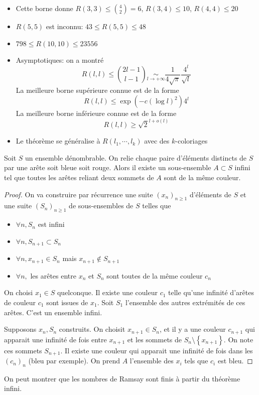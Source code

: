 \begin{rem}
\begin{itemize}
    \item Cette borne donne $R(3, 3)\leq \binom 42=6$, $R(3, 4)\leq 10$, $R(4,4)\leq 20$
    \item $R(5, 5)$ est inconnu:  $43\leq R(5, 5)\leq 48$
    \item $798\leq R(10, 10)\leq 23556$
    \item Asymptotiques: on a montré \[R(l,l)\leq  \binom{2l-1}{l-1}\underset{l\to+\infty}\sim \frac1{4\sqrt \pi}\frac{4^l}{\sqrt l}\]
        La meilleure borne supérieure connue est de la forme \[R(l,l)\leq \exp(-c(\log l)^2)4^l\]
        La meilleure borne inférieure connue est de la forme \[R(l,l)\geq  \sqrt{2}^{l+o(l)}\]
    \item Le théorème se généralise à $R(l_1, \cdots , l_k)$ avec des $k$-coloriages
\end{itemize}
\end{rem}

\begin{thm}
Soit $S$ un ensemble dénombrable. On relie chaque paire d'éléments distincts de  $S$ par une arête soit bleue soit rouge. Alors il existe un sous-ensemble  $A\subset S$ infini tel que toutes les arêtes reliant deux sommets de  $A$ sont de la même couleur.
\end{thm}

\begin{proof}
    On va construire par récurrence une suite $(x_n)_{n\geq 1}$ d'éléments de $S$ et une suite  $(S_n)_{n\geq 1}$ de sous-ensembles de $S$ telles que  \begin{itemize}
        \item $\forall  n, S_n$ est infini
        \item $\forall  n, S_{n+1}\subset S_n$
        \item $\forall n, x_{n+1}\in S_n$ mais $x_{n+1}\not \in S_{n+1}$
        \item $\forall  n,$ les arêtes entre $x_n$ et  $S_n$ sont toutes de la même couleur  $c_n$
    \end{itemize}

    On choisi $x_1 \in  S$ quelconque. Il existe une couleur $c_1$ telle qu'une infinité d'arêtes de couleur  $c_1$ sont issues de  $x_1$. Soit  $S_1$ l'ensemble des autres extrémités de ces arêtes. C'est un ensemble infini.

    Supposons  $x_n,S_n$ construits. On choisit  $x_{n+1}\in S_n$, et il y a une couleur $c_{n+1}$ qui apparait une infinité de fois entre $x_{n+1}$ et les sommets de $S_n\setminus \left\{ x_{n+1} \right\}   $. On note ces sommets $S_{n+1}$. Il existe une couleur qui apparait une infinité de fois dans les  $(c_n)_n$ (bleu par exemple). On prend  $A$ l'ensemble des  $x_i$ tels que  $c_i$ est bleu.
\end{proof}

\begin{rem}
On peut montrer que les nombres de Ramsay sont finis à partir du théorème infini.
\end{rem}



